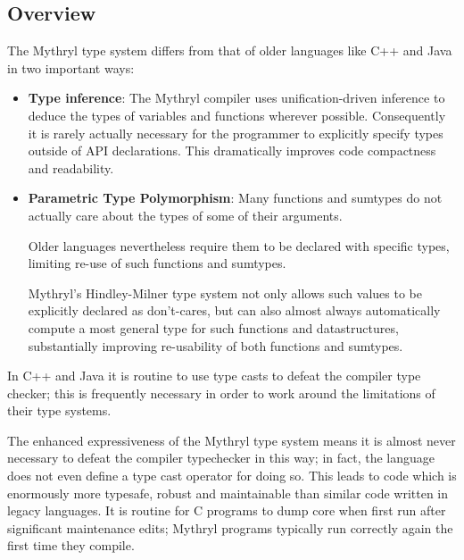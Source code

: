
\subsection{Overview}
\label{section:ref:types:overview}

The Mythryl type system differs from that of older 
languages like C++ and Java in two important ways: 

\begin{itemize}
\item {\bf Type inference}: The Mythryl compiler uses unification-driven 
      inference to deduce the types of variables and functions wherever 
      possible.  Consequently it is rarely actually necessary for the 
      programmer to explicitly specify types outside of API declarations. 
      This dramatically improves code compactness and readability.

\item {\bf Parametric Type Polymorphism}: Many functions and sumtypes 
      do not actually care about the types of some of their arguments.

      Older languages nevertheless require them to be declared with 
      specific types, limiting re-use of such functions and sumtypes.

      Mythryl's Hindley-Milner type system not only allows such values 
      to be explicitly declared as don't-cares, but can also almost always 
      automatically compute a most general type for such functions and 
      datastructures, substantially improving re-usability of both 
      functions and sumtypes.
\end{itemize}

In C++ and Java it is routine to use type casts to defeat the 
compiler type checker;  this is frequently necessary in order 
to work around the limitations of their type systems.

The enhanced expressiveness of the Mythryl type system means 
it is almost never necessary to defeat the compiler typechecker 
in this way;  in fact, the language does not even define a type 
cast operator for doing so.  This leads to code which is enormously 
more typesafe, robust and maintainable than similar code written 
in legacy languages.  It is routine for C programs to dump core 
when first run after significant maintenance edits;  Mythryl 
programs typically run correctly again the first time they 
compile.


